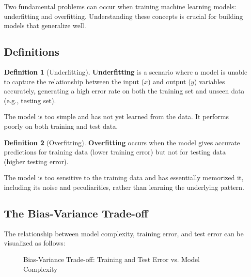 \documentclass[11pt,a4paper]{article}
\theoremstyle{definition}
\newtheorem{definition}{Definition}[section]
\theoremstyle{plain}
\theoremstyle{remark}
\begin{document}
Two fundamental problems can occur when training machine learning models: underfitting and overfitting. Understanding these concepts is crucial for building models that generalize well.

\subsection{Definitions}

\begin{definition}[Underfitting]
\textbf{Underfitting} is a scenario where a model is unable to capture the relationship between the input ($x$) and output ($y$) variables accurately, generating a high error rate on both the training set and unseen data (e.g., testing set).
\end{definition}

The model is too simple and has not yet learned from the data. It performs poorly on both training and test data.

\begin{definition}[Overfitting]
\textbf{Overfitting} occurs when the model gives accurate predictions for training data (lower training error) but not for testing data (higher testing error).
\end{definition}

The model is too sensitive to the training data and has essentially memorized it, including its noise and peculiarities, rather than learning the underlying pattern.

\subsection{The Bias-Variance Trade-off}

The relationship between model complexity, training error, and test error can be visualized as follows:

\begin{figure}[h]
\centering
{}
\caption{Bias-Variance Trade-off: Training and Test Error vs. Model Complexity}
\end{figure}
\end{document}
